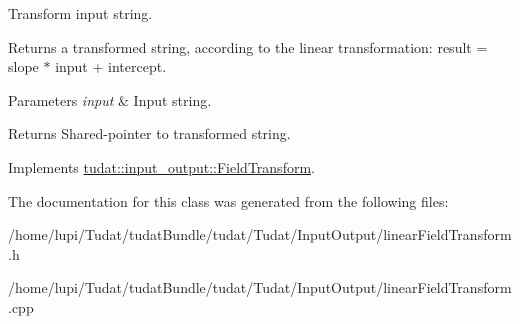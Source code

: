 Transform input string. 

Returns a transformed string, according to the linear transformation\+: result = slope $\ast$ input + intercept. 
\begin{DoxyParams}{Parameters}
{\em input} & Input string. \\
\hline
\end{DoxyParams}
\begin{DoxyReturn}{Returns}
Shared-\/pointer to transformed string. 
\end{DoxyReturn}


Implements \hyperlink{classtudat_1_1input__output_1_1FieldTransform_ab4be93a414fa1175cbc518fffe3b912a}{tudat\+::input\+\_\+output\+::\+Field\+Transform}.



The documentation for this class was generated from the following files\+:\begin{DoxyCompactItemize}
\item 
/home/lupi/\+Tudat/tudat\+Bundle/tudat/\+Tudat/\+Input\+Output/linear\+Field\+Transform.\+h\item 
/home/lupi/\+Tudat/tudat\+Bundle/tudat/\+Tudat/\+Input\+Output/linear\+Field\+Transform.\+cpp\end{DoxyCompactItemize}
